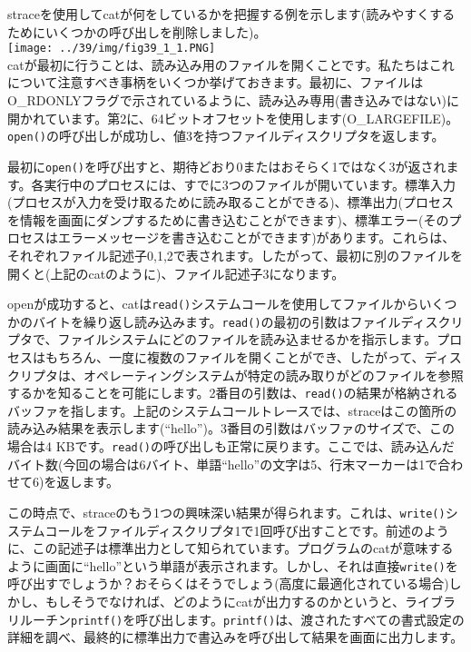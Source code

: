straceを使用してcatが何をしているかを把握する例を示します(読みやすくするためにいくつかの呼び出しを削除しました)。\\
\texttt{[image: ../39/img/fig39\_1\_1.PNG]}\\
catが最初に行うことは、読み込み用のファイルを開くことです。私たちはこれについて注意すべき事柄をいくつか挙げておきます。最初に、ファイルはO\_RDONLYフラグで示されているように、読み込み専用(書き込みではない)に開かれています。第2に、64ビットオフセットを使用します(O\_LARGEFILE)。\texttt{open()}の呼び出しが成功し、値3を持つファイルディスクリプタを返します。

最初に\texttt{open()}を呼び出すと、期待どおり0またはおそらく1ではなく3が返されます。各実行中のプロセスには、すでに3つのファイルが開いています。標準入力(プロセスが入力を受け取るために読み取ることができる)、標準出力(プロセスを情報を画面にダンプするために書き込むことができます)、標準エラー(そのプロセスはエラーメッセージを書き込むことができます)があります。これらは、それぞれファイル記述子0,1,2で表されます。したがって、最初に別のファイルを開くと(上記のcatのように)、ファイル記述子3になります。

openが成功すると、catは\texttt{read()}システムコールを使用してファイルからいくつかのバイトを繰り返し読み込みます。\texttt{read()}の最初の引数はファイルディスクリプタで、ファイルシステムにどのファイルを読み込ませるかを指示します。プロセスはもちろん、一度に複数のファイルを開くことができ、したがって、ディスクリプタは、オペレーティングシステムが特定の読み取りがどのファイルを参照するかを知ることを可能にします。2番目の引数は、\texttt{read()}の結果が格納されるバッファを指します。上記のシステムコールトレースでは、straceはこの箇所の読み込み結果を表示します(``hello'')。3番目の引数はバッファのサイズで、この場合は4
KBです。\texttt{read()}の呼び出しも正常に戻ります。ここでは、読み込んだバイト数(今回の場合は6バイト、単語``hello''の文字は5、行末マーカーは1で合わせて6)を返します。

この時点で、straceのもう1つの興味深い結果が得られます。これは、\texttt{write()}システムコールをファイルディスクリプタ1で1回呼び出すことです。前述のように、この記述子は標準出力として知られています。プログラムのcatが意味するように画面に``hello''という単語が表示されます。しかし、それは直接\texttt{write()}を呼び出すでしょうか？おそらくはそうでしょう(高度に最適化されている場合)しかし、もしそうでなければ、どのようにcatが出力するのかというと、ライブラリルーチン\texttt{printf()}を呼び出します。\texttt{printf()}は、渡されたすべての書式設定の詳細を調べ、最終的に標準出力で書込みを呼び出して結果を画面に出力します。

